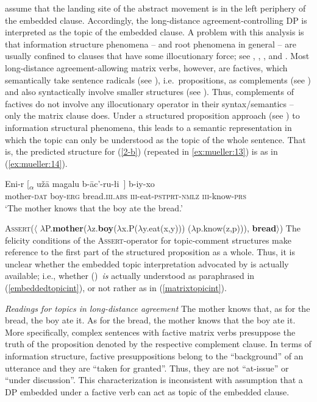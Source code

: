 \documentclass[output=paper
,modfonts
,nonflat]{langsci/langscibook}
\begin{document}
\citet{PolinskyPotsdam:01} assume that the landing site of the
abstract movement is in the left periphery of the embedded
	clause. Accordingly, the long-distance agreement-controlling DP is
	interpreted as the topic of the embedded clause. A problem with this
	analysis is that information structure phenomena -- and root phenomena
	in general -- are usually confined to clauses that have some
	illocutionary force; see \citet{HooperThompson:73},
	\citet{Ebertetal08}, \citet{Krifkainprep}, and \citet{Maticetal14}. Most long-distance agreement-allowing
	matrix verbs, however, are factives, which semantically take sentence
	radicals (see \citealt{Stenius67}), i.e.~propositions, as complements (see \citealt{Krifka04})
	and also syntactically involve smaller
	structures (see \citealt{deCubaUrogdi10}). Thus, complements of
	factives do not involve any illocutionary operator in their
	syntax/semantics -- only the matrix clause does. Under a structured
	proposition approach  (see \citealt{Krifka92}) to information structural
	phenomena, this leads to a semantic representation in which the topic
	can only be understood as the topic of the whole sentence. That is,
	the predicted structure for (\ref{2-b})  (repeated in
	\ref{ex:mueller:13}) is as in (\ref{ex:mueller:14}).
	
	
	\ea\label{ex:mueller:13}
	\gll    Eni-r [\textsubscript{{$\alpha$}} u\v{z}\={a} \label{2d-b}magalu b-\={a}c'-ru-\l i~] b-iy-xo \\
	mother-{\scshape dat} {} boy-{\scshape erg} bread.{\scshape iii.abs} {\scshape iii}-eat-{\scshape pstprt-nmlz} {\scshape iii}-know-{\scshape prs} \\
	\glt      `The mother knows that the boy ate the bread.'
	\z
	
	\ea\label{ex:mueller:14} {\scshape Assert}($\langle$ $\lambda$P.{\bfseries mother}($\lambda$z.{\bfseries boy}($\lambda$x.P($\lambda$y.eat(x,y))) ($\lambda$p.know(z,p))), {\bfseries bread}$\rangle$)\z
	The felicity conditions of the {\scshape Assert}-operator for topic-comment structures\linebreak
	make reference to the first part of the structured
	proposition as a whole. Thus, it is unclear whether the embedded topic interpretation
	advocated by \cite{PolinskyPotsdam:01}  is actually available;
	i.e.,  whether (\LLast)\ {\itshape is} actually understood as paraphrased in (\ref{embeddedtopicint}), or not rather as in (\ref{matrixtopicint}).
	
	\ea\label{ex:mueller:15} \textit{Readings for topics in long-distance agreement}
	\ea \label{embeddedtopicint}The mother knows that, as for the bread, the boy ate it.
	\ex \label{matrixtopicint}As for the bread, the mother knows that the boy ate it.
	\z
	\z
	More specifically, complex sentences with factive matrix verbs
	presuppose the truth of the proposition denoted by the respective
	complement clause. In terms of information structure, factive
	presuppositions belong to the ``background'' of an utterance and they
	are ``taken for granted''. Thus, they are not ``at-issue'' or ``under
	discussion''. This characterization is inconsistent with
	 assumption that a DP embedded under a factive verb
	can act as topic of the embedded clause.
	
\end{document}
